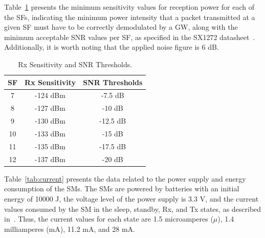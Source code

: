 \documentclass[a4paper,fleqn]{cas-dc}
\begin{document}
Table~\ref{tab:sx1272} presents the minimum sensitivity values for reception power for each of the SFs, indicating the minimum power intensity that a packet transmitted at a given \gls{SF} must have to be correctly demodulated by a GW, along with the minimum acceptable \gls{SNR} values per \gls{SF}, as specified in the SX1272 datasheet~\cite{semtech2024sx1272}. Additionally, it is worth noting that the applied noise figure is 6 dB.

\begin{table}[ht]
    \centering
    \caption{Rx Sensitivity and SNR Thresholds.}
    \begin{tabular}{ccc}
        \hline \hline
         SF & Rx Sensitivity & SNR Thresholds \\ \hline
          7 & -124 dBm &  -7.5 dB\\
          8 & -127 dBm &  -10 dB\\
          9 & -130 dBm &  -12.5 dB \\
         10 & -133 dBm &  -15 dB \\  
         11 & -135 dBm &  -17.5 dB \\
         12 & -137 dBm &  -20 dB \\ \hline \hline
    \end{tabular}
    \label{tab:sx1272}
\end{table}

Table~\ref{tab:current} presents the data related to the power supply and energy consumption of the \gls{SMs}. The \gls{SMs} are powered by batteries with an initial energy of 10000 J, the voltage level of the power supply is 3.3 V, and the current values consumed by the SM in the sleep, standby, Rx, and Tx states, as described in~\cite{magrin2020lora}. Thus, the current values for each state are 1.5 microamperes (\(\mu\)), 1.4 milliamperes (mA), 11.2 mA, and 28 mA.
\end{document}
